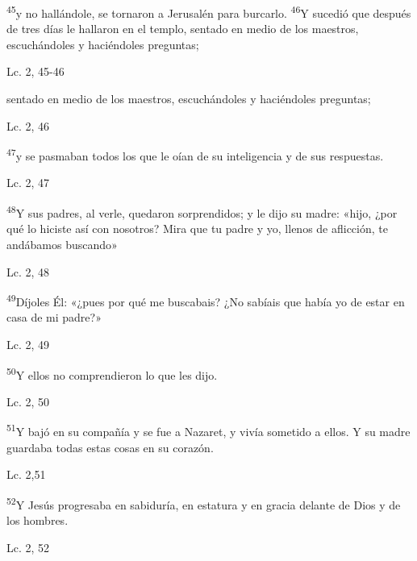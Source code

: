 \documentclass[a4paper,11pt]{article}
\begin{document}
      \textsuperscript{45}y no hallándole, se tornaron a Jerusalén para burcarlo. \textsuperscript{46}Y sucedió que después de tres días le hallaron en el templo,
      sentado en medio de los maestros, escuchándoles y haciéndoles preguntas;
      \begin{flushright}
        Lc. 2, 45-46       
      \end{flushright}
      
      sentado en medio de los maestros, escuchándoles y haciéndoles preguntas;
      \begin{flushright}
        Lc. 2, 46       
      \end{flushright}
      
      \textsuperscript{47}y se pasmaban todos los que le oían de su inteligencia y de sus respuestas.
      \begin{flushright}
        Lc. 2, 47     
      \end{flushright}

      \textsuperscript{48}Y sus padres, al verle, quedaron sorprendidos; y le dijo su madre: «hijo, ¿por qué lo hiciste así con nosotros? Mira que tu padre
      y yo, llenos de aflicción, te andábamos buscando»
      \begin{flushright}
        Lc. 2, 48     
      \end{flushright}
      
      \textsuperscript{49}Díjoles Él: «¿pues por qué me buscabais? ¿No sabíais que había yo de estar en casa de mi padre?»
      \begin{flushright}
        Lc. 2, 49        
      \end{flushright}
      
      \textsuperscript{50}Y ellos no comprendieron lo que les dijo.
      \begin{flushright}
        Lc. 2, 50        
      \end{flushright}
      
      \textsuperscript{51}Y bajó en su compañía y se fue a Nazaret, y vivía sometido a ellos. Y su madre guardaba todas estas
      cosas en su corazón.
      \begin{flushright}
        Lc. 2,51       
      \end{flushright}     
      
      \textsuperscript{52}Y Jesús progresaba en sabiduría, en estatura y en gracia delante de Dios y de los hombres.
      \begin{flushright}
        Lc. 2, 52        
      \end{flushright}
            
\end{document}
